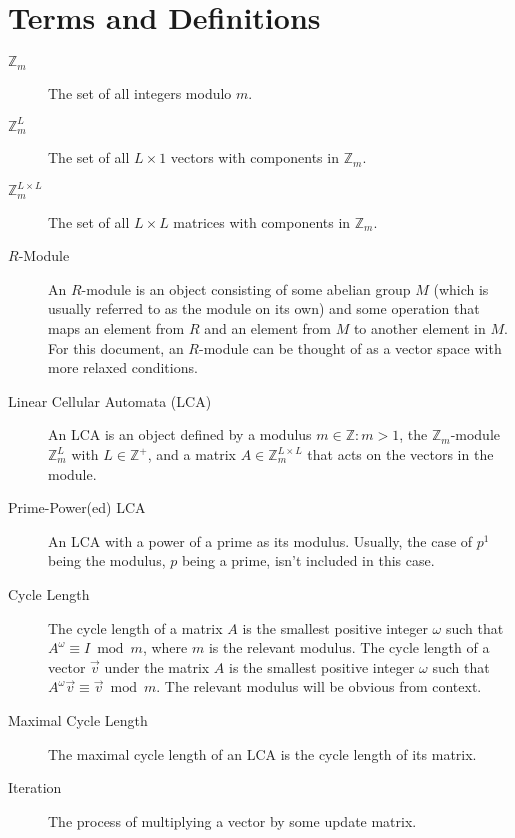 \documentclass[a4paper, reqno, 12pt]{amsart}
\begin{document}
	\section{Terms and Definitions}
		\begin{description}
			\item[$\mathds{Z}_{m}$] The set of all integers modulo $m$.
			
			\item[$\mathds{Z}_{m}^{L}$] The set of all $L \times 1$ vectors with components in $\mathds{Z}_{m}$.
			
			\item[$\mathds{Z}_{m}^{L \times L}$] The set of all $L \times L$ matrices with components in $\mathds{Z}_{m}$.
			
			\item[$R$-Module] An $R$-module is an object consisting of some abelian group $M$ (which is usually referred to as the module on its own) and some operation
			that maps an element from $R$ and an element from $M$ to another element in $M$. For this document, an $R$-module can be thought of as a vector space with
			more relaxed conditions.
			
			\item[Linear Cellular Automata (LCA)] An LCA is an object defined by a modulus $m \in \mathds{Z} : m > 1$, the $\mathds{Z}_{m}$-module 
			$\mathds{Z}_{m}^{L}$ with $L \in \mathds{Z}^{+}$, and a matrix $A \in \mathds{Z}_{m}^{L \times L}$ that acts on the vectors in the module.
			
			\item[Prime-Power(ed) LCA] An LCA with a power of a prime as its modulus. Usually, the case of $p^1$ being the modulus, $p$ being a prime, isn't
			included in this case.
			
			\item[Cycle Length] The cycle length of a matrix $A$ is the smallest positive integer $\omega$ such that $A^{\omega} \equiv I \bmod{m}$, where $m$ is
			the relevant modulus. The cycle length of a vector $\vec{v}$ under the matrix $A$ is the smallest positive integer $\omega$ such that 
			$A^{\omega}\vec{v} \equiv \vec{v} \bmod{m}$. The relevant modulus will be obvious from context. 
			
			\item[Maximal Cycle Length] The maximal cycle length of an LCA is the cycle length of its matrix.
			
			\item[Iteration] The process of multiplying a vector by some update matrix.
		\end{description}
		
\end{document}
